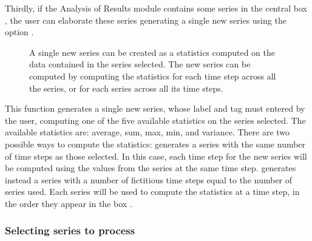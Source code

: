 \documentclass [11pt,a4paper] {book}
\begin{document}
Thirdly, if the Analysis of Results module contains some series in the central box , the user can elaborate these series generating a single new series using the option .

\begin{figure}[ht]
  \centering
  \caption{\small A single new series can be created as a statistics computed on the data contained in the series selected. The new series can be computed by computing the statistics for each time step across all the series, or for each series across all its time steps.}
  \label{fig:create_series}
\end{figure}

This function generates a single new series, whose label and tag must entered by the user, computing one of the five available statistics on the series selected. The available statistics are: average, sum, max, min, and variance. There are two possible ways to compute the statistics:  generates a series with the same number of time steps as those selected. In this case, each time step for the new series will be computed using the values from the series at the same time step.  generates instead a series with a number of fictitious time steps equal to the number of series used. Each series will be used to compute the statistics at a time step, in the order they appear in the box .


\subsubsection{Selecting series to process}
\end{document}
